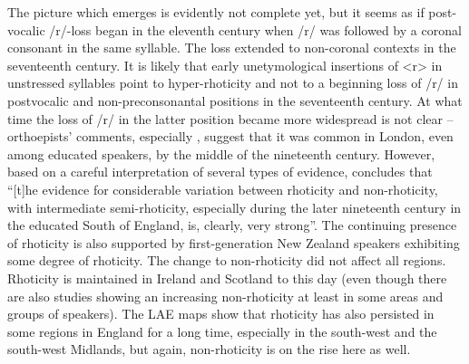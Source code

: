 The picture which emerges is evidently not complete yet, but it seems as if post-vocalic /r/-loss began in the eleventh century when /r/ was followed by a coronal consonant in the same syllable. The loss extended to non-coronal contexts in the seventeenth century. It is likely that early unetymological insertions of <r> in unstressed syllables point to hyper-rhoticity and not to a beginning loss of /r/ in postvocalic and non-preconsonantal positions in the seventeenth century. At what time the loss of /r/ in the latter position became more widespread is not clear – orthoepists’ comments, especially \citet{Ellis1869}, suggest that it was common in London, even among educated speakers, by the middle of the nineteenth century. However, based on a careful interpretation of several types of evidence, \citet[475]{MacMahon1998} concludes that “[t]he evidence for considerable variation between rhoticity and non-rhoticity, with intermediate semi-rhoticity, especially during the later nineteenth century in the educated South of England, is, clearly, very strong”. The continuing presence of rhoticity is also supported by first-generation New Zealand speakers exhibiting some degree of rhoticity. The change to non-rhoticity did not affect all regions. Rhoticity is maintained in Ireland and Scotland to this day (even though there are also studies showing an increasing non-rhoticity at least in some areas and groups of speakers). The LAE maps show that rhoticity has also persisted in some regions in England for a long time, especially in the south-west and the south-west Midlands, but again, non-rhoticity is on the rise here as well.

